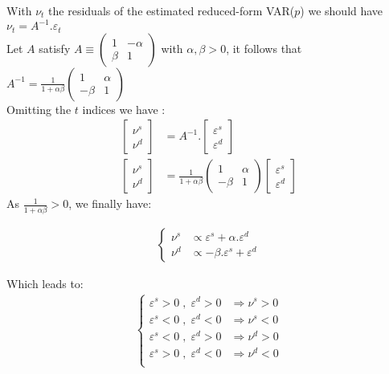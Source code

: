 \vspace*{.4cm}
\noindent With $\nu_{t}$ the residuals of the estimated reduced-form VAR($p$) we should have $\nu_{t} = A^{-1}.\varepsilon_{t}$\\
Let $A$ satisfy $
    A \equiv\begin{pmatrix} 1 & - \alpha \\ \beta & 1 \end{pmatrix}
    $ 
with $\alpha, \beta > 0$, it follows that
$
A^{-1} = \frac{1}{1+\alpha \beta}\begin{pmatrix} 1 & \alpha \\ -\beta & 1 \end{pmatrix}
$\\
Omitting the $t$ indices we have : 
\begin{align*}
    \begin{bmatrix} \nu^{s} \\ \nu^{d} \end{bmatrix} &= A^{-1}.\begin{bmatrix} \varepsilon^{s} \\ \varepsilon^{d} \end{bmatrix} \\
    \begin{bmatrix} \nu^{s} \\ \nu^{d} \end{bmatrix} &= \frac{1}{1+\alpha \beta}\begin{pmatrix} 1 & \alpha \\ -\beta & 1 \end{pmatrix} \begin{bmatrix} \varepsilon^{s} \\ \varepsilon^{d} \end{bmatrix}
\end{align*}
As $\frac{1}{1+\alpha \beta} > 0$, we finally have:

\begin{align*}
    \begin{cases}
        \nu^{s} &\propto \varepsilon^{s} + \alpha.\varepsilon^{d} \\
        \nu^{d} &\propto -\beta.\varepsilon^{s} + \varepsilon^{d}
    \end{cases}
\end{align*}

\noindent Which leads to:
\begin{align*}
    \begin{cases}
        \varepsilon^{s}>0 \;,\; \varepsilon^{d}>0 & \Rightarrow \nu^{s}>0 \\
        \varepsilon^{s}<0 \;,\; \varepsilon^{d}<0 & \Rightarrow \nu^{s}<0 \\
        \varepsilon^{s}<0 \;,\; \varepsilon^{d}>0 & \Rightarrow \nu^{d}>0 \\
        \varepsilon^{s}>0 \;,\; \varepsilon^{d}<0 & \Rightarrow \nu^{d}<0 \\
    \end{cases}  
\end{align*}

